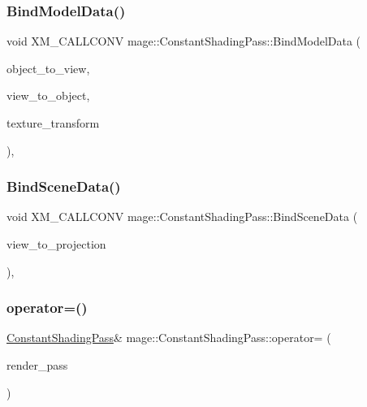 \subsubsection{\texorpdfstring{Bind\+Model\+Data()}{BindModelData()}}
{\footnotesize\ttfamily void X\+M\+\_\+\+C\+A\+L\+L\+C\+O\+NV mage\+::\+Constant\+Shading\+Pass\+::\+Bind\+Model\+Data (\begin{DoxyParamCaption}\item[{F\+X\+M\+M\+A\+T\+R\+IX}]{object\+\_\+to\+\_\+view,  }\item[{F\+X\+M\+M\+A\+T\+R\+IX}]{view\+\_\+to\+\_\+object,  }\item[{F\+X\+M\+M\+A\+T\+R\+IX}]{texture\+\_\+transform }\end{DoxyParamCaption})\hspace{0.3cm}{\ttfamily [private]}, {\ttfamily [noexcept]}}

\hypertarget{classmage_1_1_constant_shading_pass_a26af4a4f340be3b4c153c81a571aae8c}{}\label{classmage_1_1_constant_shading_pass_a26af4a4f340be3b4c153c81a571aae8c} 
\subsubsection{\texorpdfstring{Bind\+Scene\+Data()}{BindSceneData()}}
{\footnotesize\ttfamily void X\+M\+\_\+\+C\+A\+L\+L\+C\+O\+NV mage\+::\+Constant\+Shading\+Pass\+::\+Bind\+Scene\+Data (\begin{DoxyParamCaption}\item[{F\+X\+M\+M\+A\+T\+R\+IX}]{view\+\_\+to\+\_\+projection }\end{DoxyParamCaption})\hspace{0.3cm}{\ttfamily [private]}, {\ttfamily [noexcept]}}

\hypertarget{classmage_1_1_constant_shading_pass_ada08b06e66c1d1da2f869b96b71f3202}{}\label{classmage_1_1_constant_shading_pass_ada08b06e66c1d1da2f869b96b71f3202} 
\subsubsection{\texorpdfstring{operator=()}{operator=()}\hspace{0.1cm}{\footnotesize\ttfamily [1/2]}}
{\footnotesize\ttfamily \hyperlink{classmage_1_1_constant_shading_pass}{Constant\+Shading\+Pass}\& mage\+::\+Constant\+Shading\+Pass\+::operator= (\begin{DoxyParamCaption}\item[{const \hyperlink{classmage_1_1_constant_shading_pass}{Constant\+Shading\+Pass} \&}]{render\+\_\+pass }\end{DoxyParamCaption})\hspace{0.3cm}{\ttfamily [delete]}}

